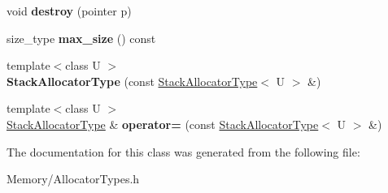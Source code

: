 \begin{DoxyCompactItemize}
void {\bfseries destroy} (pointer p)
\item 
\mbox{\label{classCantMemory_1_1StackAllocatorType_ae928e1afae9970ee0dd24eb736bd89a7}} 
size\+\_\+type {\bfseries max\+\_\+size} () const
\item 
\mbox{\label{classCantMemory_1_1StackAllocatorType_a1e9e5b781d1a0db13417a3c3738e6db4}} 
{\footnotesize template$<$class U $>$ }\\{\bfseries Stack\+Allocator\+Type} (const \hyperlink{classCantMemory_1_1StackAllocatorType}{Stack\+Allocator\+Type}$<$ U $>$ \&)
\item 
\mbox{\label{classCantMemory_1_1StackAllocatorType_ae34cf9efdb87b1fb493ed2fd8d76e78b}} 
{\footnotesize template$<$class U $>$ }\\\hyperlink{classCantMemory_1_1StackAllocatorType}{Stack\+Allocator\+Type} \& {\bfseries operator=} (const \hyperlink{classCantMemory_1_1StackAllocatorType}{Stack\+Allocator\+Type}$<$ U $>$ \&)
\end{DoxyCompactItemize}


The documentation for this class was generated from the following file\+:\begin{DoxyCompactItemize}
\item 
Memory/Allocator\+Types.\+h\end{DoxyCompactItemize}
